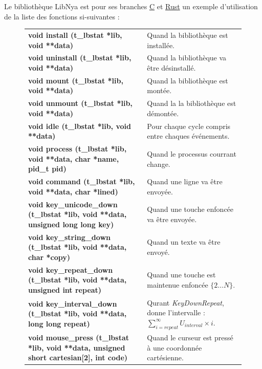\documentclass{report}
\newcommand{\violet}{\rowcolor{violet!10}}
\begin{document}
Le bibliothèque LibNya est pour ses branches \href{https://github.com/Arukana/LibNya/tree/c}{C} et \href{https://github.com/Arukana/LibNya}{Rust} un exemple d'utilisation de la liste des fonctions si-suivantes : \\

\begin{figure}[!ht]
    \begin{minipage}{\textwidth}
    \centering
        \begin{tabular}{p{}p{}}
            \textbf{void install (t\_lbstat *lib, void **data)} & Quand la bibliothèque est installée. \\
            \textbf{void uninstall (t\_lbstat *lib, void **data)} & Quand la bibliothèque va être désinstallé. \\
            \textbf{void mount (t\_lbstat *lib, void **data)} & Quand la bibliothèque est montée. \\
            \textbf{void unmount (t\_lbstat *lib, void **data)} & Quand la la bibliothèque est démontée. \\
            \textbf{void idle (t\_lbstat *lib, void **data)} & Pour chaque cycle compris entre chaques événements. \\
            \textbf{void process (t\_lbstat *lib, void **data, char *name, pid\_t pid)} & Quand le processus courrant change. \\
            \textbf{void command (t\_lbstat *lib, void **data, char *lined)} & Quand une ligne va être envoyée. \\
            \textbf{void key\_unicode\_down (t\_lbstat *lib, void **data, unsigned long long key)} & Quand une touche enfoncée va être envoyée. \\
            \textbf{void key\_string\_down (t\_lbstat *lib, void **data, char *copy)} & Quand un texte va être envoyé. \\
            \violet
            \textbf{void key\_repeat\_down (t\_lbstat *lib, void **data, unsigned int repeat)} & Quand une touche est maintenue enfoncée $\{2\dots{}N\}$. \\
            \violet
            \textbf{void key\_interval\_down (t\_lbstat *lib, void **data, long long repeat)} & Qurant \textit{KeyDownRepeat}, donne l'intervalle : $\sum_{i=repeat}^{\infty} U_{interval}\times{}i$. \\
            \textbf{void mouse\_press (t\_lbstat *lib, void **data, unsigned short cartesian[2], int code)} & Quand le curseur est pressé à une coordonnée cartésienne. \\

\end{tabular}
\end{minipage}
\end{figure}
\end{document}
